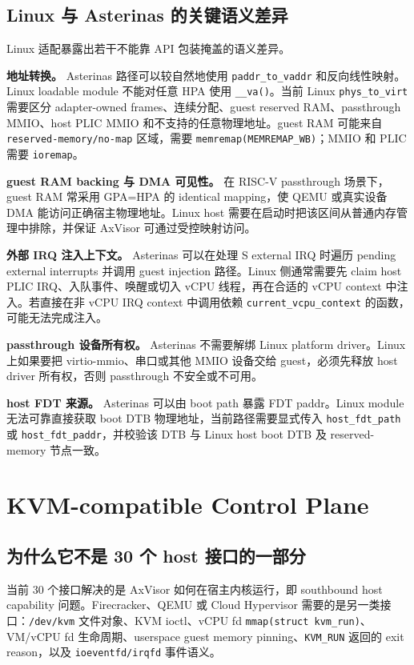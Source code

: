 \documentclass[a4paper,11pt]{article}
\begin{document}
\subsection{Linux 与 Asterinas 的关键语义差异}

Linux 适配暴露出若干不能靠 API 包装掩盖的语义差异。

\textbf{地址转换。}
Asterinas 路径可以较自然地使用 \texttt{paddr\_to\_vaddr} 和反向线性映射。Linux loadable module 不能对任意 HPA 使用 \texttt{\_\_va()}。当前 Linux \texttt{phys\_to\_virt} 需要区分 adapter-owned frames、连续分配、guest reserved RAM、passthrough MMIO、host PLIC MMIO 和不支持的任意物理地址。guest RAM 可能来自 \texttt{reserved-memory/no-map} 区域，需要 \texttt{memremap(MEMREMAP\_WB)}；MMIO 和 PLIC 需要 \texttt{ioremap}。

\textbf{guest RAM backing 与 DMA 可见性。}
在 RISC-V passthrough 场景下，guest RAM 常采用 GPA=HPA 的 identical mapping，使 QEMU 或真实设备 DMA 能访问正确宿主物理地址。Linux host 需要在启动时把该区间从普通内存管理中排除，并保证 AxVisor 可通过受控映射访问。

\textbf{外部 IRQ 注入上下文。}
Asterinas 可以在处理 S external IRQ 时遍历 pending external interrupts 并调用 guest injection 路径。Linux 侧通常需要先 claim host PLIC IRQ、入队事件、唤醒或切入 vCPU 线程，再在合适的 vCPU context 中注入。若直接在非 vCPU IRQ context 中调用依赖 \texttt{current\_vcpu\_context} 的函数，可能无法完成注入。

\textbf{passthrough 设备所有权。}
Asterinas 不需要解绑 Linux platform driver。Linux 上如果要把 virtio-mmio、串口或其他 MMIO 设备交给 guest，必须先释放 host driver 所有权，否则 passthrough 不安全或不可用。

\textbf{host FDT 来源。}
Asterinas 可以由 boot path 暴露 FDT paddr。Linux module 无法可靠直接获取 boot DTB 物理地址，当前路径需要显式传入 \texttt{host\_fdt\_path} 或 \texttt{host\_fdt\_paddr}，并校验该 DTB 与 Linux host boot DTB 及 reserved-memory 节点一致。

\section{KVM-compatible Control Plane}

\subsection{为什么它不是 30 个 host 接口的一部分}

当前 30 个接口解决的是 AxVisor 如何在宿主内核运行，即 southbound host capability 问题。Firecracker、QEMU 或 Cloud Hypervisor 需要的是另一类接口：\texttt{/dev/kvm} 文件对象、KVM ioctl、vCPU fd \texttt{mmap(struct kvm\_run)}、VM/vCPU fd 生命周期、userspace guest memory pinning、\texttt{KVM\_RUN} 返回的 exit reason，以及 \texttt{ioeventfd/irqfd} 事件语义。
\end{document}

